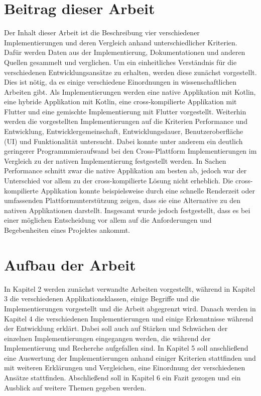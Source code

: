 \section{Beitrag dieser Arbeit}
Der Inhalt dieser Arbeit ist die Beschreibung vier verschiedener Implementierungen und deren Vergleich anhand unterschiedlicher Kriterien. Dafür werden Daten aus der Implementierung, Dokumentationen und anderen Quellen gesammelt und verglichen.
Um ein einheitliches Verständnis für die verschiedenen Entwicklungsansätze zu erhalten, werden diese zunächst vorgestellt. Dies ist nötig, da es einige verschiedene Einordnungen in wissenschaftlichen Arbeiten gibt.
Als Implementierungen werden eine native Applikation mit Kotlin, eine hybride Applikation mit Kotlin, eine cross-kompilierte Applikation mit Flutter und eine gemischte Implementierung mit Flutter vorgestellt. 
Weiterhin werden die vorgestellten Implementierungen auf die Kriterien Performance und Entwicklung, Entwicklergemeinschaft, Entwicklungsdauer, Benutzeroberfläche (UI) und Funktionalität untersucht.
Dabei konnte unter anderem ein deutlich geringerer Programmmieraufwand bei den Cross-Plattform Implementierungen im Vergleich zu der nativen Implementierung festgestellt werden. In Sachen Performance schnitt zwar die native Applikation am besten ab, jedoch war der Unterschied vor allem zu der cross-kompilierte Lösung nicht erheblich. Die cross-kompilierte Applikation konnte beispielsweise durch eine schnelle Renderzeit oder umfassenden Plattformunterstützung zeigen, dass sie eine Alternative zu den nativen Applikationen darstellt. Insgesamt wurde jedoch festgestellt, dass es bei einer möglichen Entscheidung vor allem auf die Anforderungen und Begebenheiten eines Projektes ankommt.

\section{Aufbau der Arbeit}
In Kapitel 2 werden zunächst verwandte Arbeiten vorgestellt, während in Kapitel 3 die verschiedenen Applikationsklassen, einige Begriffe und die Implementierungen vorgestellt und die Arbeit abgegrenzt wird.
Danach werden in Kapitel 4 die verschiedenen Implementierungen und einige Erkenntnisse während der Entwicklung erklärt. Dabei soll auch auf Stärken und Schwächen der einzelnen Implementierungen eingegangen werden, die während der Implementierung und Recherche aufgefallen sind.
In Kapitel 5 soll anschließend eine Auswertung der Implementierungen anhand einiger Kriterien stattfinden und mit weiteren Erklärungen und Vergleichen, eine Einordnung der verschiedenen Ansätze stattfinden. Abschließend soll in Kapitel 6 ein Fazit gezogen und ein Ausblick auf weitere Themen gegeben werden.